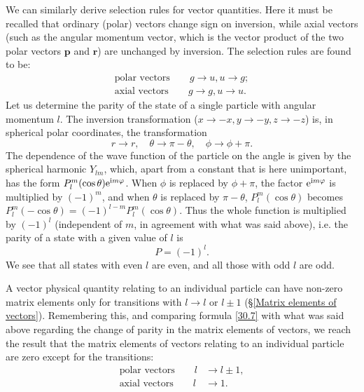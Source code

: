 We can similarly derive selection rules for vector quantities. Here it must be recalled that ordinary (polar) vectors change sign on inversion, while axial vectors (such as the angular momentum vector, which is the vector product of the two polar vectors $ \bm{p} $ and $ \bm{r} $) are unchanged by inversion. The selection rules are found to be:
\begin{equation}\label{30.5}
\begin{split}
\text{polar vectors}\qquad g\to u,u\to g;\\
\text{axial vectors}\qquad g\to g,u\to u.
\end{split}
\end{equation}
Let us determine the parity of the state of a single particle with angular momentum $ l $. The inversion transformation ($ x \to-x, y \to-y, z \to-z $) is, in spherical polar coordinates, the transformation
\begin{equation}\label{30.6}
r\to r,\quad\theta\to\pi-\theta,\quad\phi\to\phi+\pi.
\end{equation}
The dependence of the wave function of the particle on the angle is given by the spherical harmonic $ Y_{lm} $, which, apart from a constant that is here unimportant, has the form $ P_l^m(\cos\theta)\mathrm{e}^{\mathrm{i} m\varphi} $. When $\phi$ is replaced by $ \phi+\pi $, the factor $ \mathrm{e}^{\mathrm{i} m\varphi} $ is multiplied by $ (-1)^m $, and when $\theta$ is replaced by $ \pi-\theta $, $ P_l^m(\cos\theta) $ becomes $ P_l^m(-\cos\theta)=(-1)^{l-m}P_l^m(\cos\theta) $. Thus the whole function is multiplied by $ (-1)^l $ (independent of $ m $, in agreement with what was said above), i.e. the parity of a state with a given value of $ l $ is
\begin{equation}\label{30.7}
P=(-1)^l.
\end{equation}
We see that all states with even $ l $ are even, and all those with odd $ l $ are odd.

A vector physical quantity relating to an individual particle can have non-zero matrix elements only for transitions with $ l \to l $ or $ l \pm 1 $ (\S\ref{Matrix elements of vectors}). Remembering this, and comparing formula \eqref{30.7} with what was said above regarding the change of parity in the matrix elements of vectors, we reach the result that the matrix elements of vectors relating to an individual particle are zero except for the transitions:
\begin{equation}\label{30.8}
\begin{split}
\text{polar vectors}\qquad l&\to l\pm 1,\\
\text{axial vectors}\qquad l&\to 1.
\end{split}
\end{equation}






